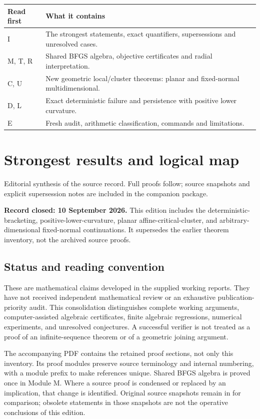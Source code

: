 \documentclass[10pt,oneside,openany]{book}
\newcommand{\ModuleTag}{I}
\theoremstyle{remark}\newtheorem{remark}{Remark}[chapter]
\newcommand{\StartModule}[3]{\cleardoublepage\renewcommand{\ModuleTag}{#1}\chapter{#2}\label{#1:chapter}\begin{small}\color{Accent}#3\end{small}\par\vspace{3pt}{\color{RuleGray}\hrule}\vspace{9pt}}
\begin{document}
\begin{center}
\begin{tabular}{p{}p{}}
\toprule
Read first & What it contains\\\midrule
I & The strongest statements, exact quantifiers, supersessions and unresolved cases.\\
M, T, R & Shared BFGS algebra, objective certificates and radial interpretation.\\
C, U & New geometric local/cluster theorems: planar and fixed-normal multidimensional.\\
D, L & Exact deterministic failure and persistence with positive lower curvature.\\
E & Fresh audit, arithmetic classification, commands and limitations.\\\bottomrule
\end{tabular}
\end{center}
\tableofcontents
\mainmatter
\StartModule{I}{Strongest results and logical map}{Editorial synthesis of the source record. Full proofs follow; source snapshots and explicit supersession notes are included in the companion package.}

\textbf{Record closed: 10 September 2026.} This edition includes the deterministic-bracketing, positive-lower-curvature, planar affine-critical-cluster, and arbitrary-dimensional fixed-normal continuations. It supersedes the earlier theorem inventory, not the archived source proofs.

\section*{Status and reading convention}\label{status-and-reading-convention}

These are mathematical claims developed in the supplied working reports. They have not received independent mathematical review or an exhaustive publication-priority audit. This consolidation distinguishes complete working arguments, computer-assisted algebraic certificates, finite algebraic regressions, numerical experiments, and unresolved conjectures. A successful verifier is not treated as a proof of an infinite-sequence theorem or of a geometric joining argument.

The accompanying PDF contains the retained proof sections, not only this inventory. Its proof modules preserve source terminology and internal numbering, with a module prefix to make references unique. Shared BFGS algebra is proved once in Module M. Where a source proof is condensed or replaced by an implication, that change is identified. Original source snapshots remain in  for comparison; obsolete statements in those snapshots are not the operative conclusions of this edition.
\end{document}
